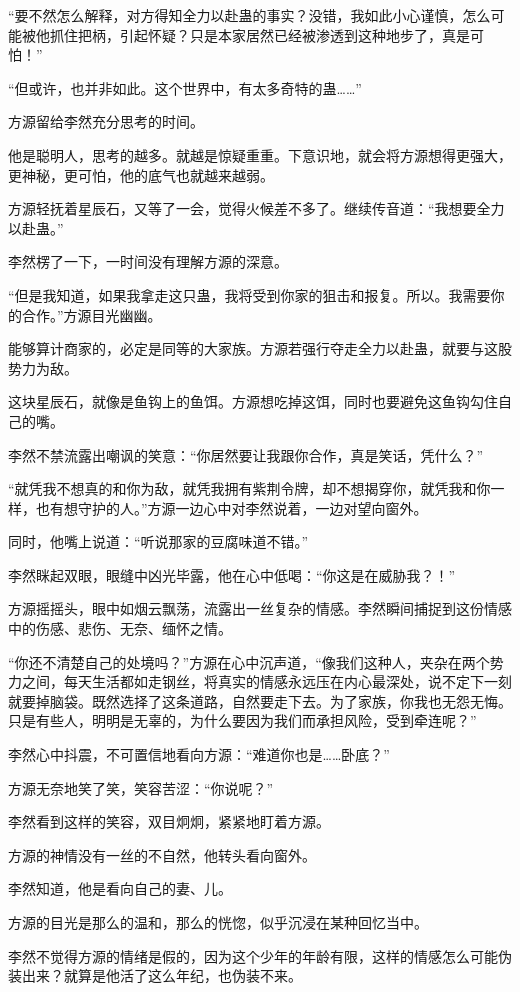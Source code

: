 \begin{this_body}
“要不然怎么解释，对方得知全力以赴蛊的事实？没错，我如此小心谨慎，怎么可能被他抓住把柄，引起怀疑？只是本家居然已经被渗透到这种地步了，真是可怕！”

“但或许，也并非如此。这个世界中，有太多奇特的蛊……”

方源留给李然充分思考的时间。

他是聪明人，思考的越多。就越是惊疑重重。下意识地，就会将方源想得更强大，更神秘，更可怕，他的底气也就越来越弱。

方源轻抚着星辰石，又等了一会，觉得火候差不多了。继续传音道：“我想要全力以赴蛊。”

李然楞了一下，一时间没有理解方源的深意。

“但是我知道，如果我拿走这只蛊，我将受到你家的狙击和报复。所以。我需要你的合作。”方源目光幽幽。

能够算计商家的，必定是同等的大家族。方源若强行夺走全力以赴蛊，就要与这股势力为敌。

这块星辰石，就像是鱼钩上的鱼饵。方源想吃掉这饵，同时也要避免这鱼钩勾住自己的嘴。

李然不禁流露出嘲讽的笑意：“你居然要让我跟你合作，真是笑话，凭什么？”

“就凭我不想真的和你为敌，就凭我拥有紫荆令牌，却不想揭穿你，就凭我和你一样，也有想守护的人。”方源一边心中对李然说着，一边对望向窗外。

同时，他嘴上说道：“听说那家的豆腐味道不错。”

李然眯起双眼，眼缝中凶光毕露，他在心中低喝：“你这是在威胁我？！”

方源摇摇头，眼中如烟云飘荡，流露出一丝复杂的情感。李然瞬间捕捉到这份情感中的伤感、悲伤、无奈、缅怀之情。

“你还不清楚自己的处境吗？”方源在心中沉声道，“像我们这种人，夹杂在两个势力之间，每天生活都如走钢丝，将真实的情感永远压在内心最深处，说不定下一刻就要掉脑袋。既然选择了这条道路，自然要走下去。为了家族，你我也无怨无悔。只是有些人，明明是无辜的，为什么要因为我们而承担风险，受到牵连呢？”

李然心中抖震，不可置信地看向方源：“难道你也是……卧底？”

方源无奈地笑了笑，笑容苦涩：“你说呢？”

李然看到这样的笑容，双目炯炯，紧紧地盯着方源。

方源的神情没有一丝的不自然，他转头看向窗外。

李然知道，他是看向自己的妻、儿。

方源的目光是那么的温和，那么的恍惚，似乎沉浸在某种回忆当中。

李然不觉得方源的情绪是假的，因为这个少年的年龄有限，这样的情感怎么可能伪装出来？就算是他活了这么年纪，也伪装不来。


\end{this_body}

